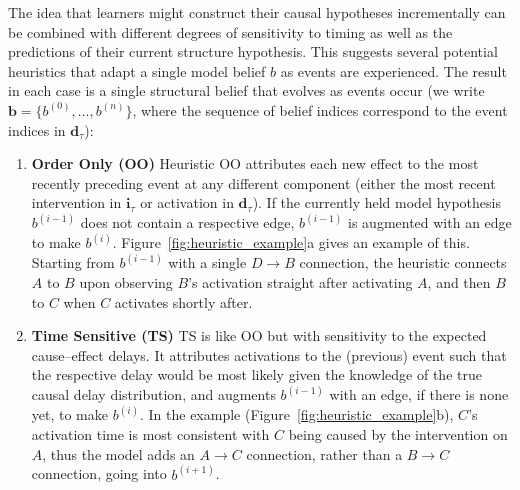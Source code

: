 \documentclass[10pt,letterpaper]{article}
\newcommand{\ci}{\mathbf{i}} %
\newcommand{\da}{\mathbf{d}} %
\begin{document}
The idea that learners might construct their causal hypotheses incrementally can be combined with different degrees of sensitivity to timing as well as the predictions of their current structure hypothesis.  This suggests several potential heuristics that adapt a single model belief $b$ as events are experienced.  The result in each case is a single structural belief that evolves as events occur (we write $\mathbf{b} = \{b^{(0)},\ldots, b^{(n)}\}$, where the sequence of belief indices correspond to the event indices in $\da_{\tau}$):

\begin{enumerate}

\item \textbf{Order Only (OO)}  Heuristic OO attributes each new effect to the most recently preceding event at any different component (either the most recent intervention in $\ci_{\tau}$ or activation in $\da_{\tau}$).  If the currently held model hypothesis $b^{(i-1)}$ does not contain a respective edge, $b^{(i-1)}$ is augmented with an edge to make $b^{(i)}$.  Figure~\ref{fig:heuristic_example}a gives an example of this.  Starting from $b^{(i-1)}$ with a single $D\rightarrow B$ connection, the heuristic connects $A$ to $B$ upon observing $B$'s activation straight after activating $A$, and then $B$ to $C$ when $C$ activates shortly after.

\item \textbf{Time Sensitive (TS)} TS is like OO but with sensitivity to the expected cause--effect delays.  It attributes activations to the (previous) event such that the respective delay would be most likely given the knowledge of the true causal delay distribution, and augments $b^{(i-1)}$ with an edge, if there is none yet, to make $b^{(i)}$.  %
In the example (Figure~\ref{fig:heuristic_example}b), $C$'s activation time is most consistent with $C$ being caused by the intervention on $A$, thus the model adds an $A\rightarrow C$ connection, rather than a $B\rightarrow C$ connection, going into $b^{(i+1)}$.%


\end{enumerate}
\end{document}
